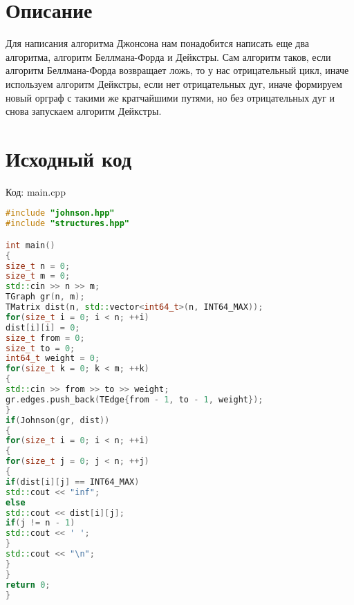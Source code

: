 \section{Описание}
Для написания алгоритма Джонсона нам понадобится написать еще два алгоритма, алгоритм Беллмана-Форда и Дейкстры. Сам алгоритм таков, если алгоритм
Беллмана-Форда возвращает ложь, то у нас отрицательный цикл, иначе используем
алгоритм Дейкстры, если нет отрицательных дуг, иначе формируем новый орграф
с такими же кратчайшими путями, но без отрицательных дуг и снова запускаем
алгоритм Дейкстры.

\pagebreak

\section{Исходный код}

Код: main.cpp
\begin{lstlisting}[language=C++]
#include "johnson.hpp"
#include "structures.hpp"

int main()
{
size_t n = 0;
size_t m = 0;
std::cin >> n >> m;
TGraph gr(n, m);
TMatrix dist(n, std::vector<int64_t>(n, INT64_MAX));
for(size_t i = 0; i < n; ++i)
dist[i][i] = 0;
size_t from = 0;
size_t to = 0;
int64_t weight = 0;
for(size_t k = 0; k < m; ++k)
{
std::cin >> from >> to >> weight;
gr.edges.push_back(TEdge{from - 1, to - 1, weight});
}
if(Johnson(gr, dist))
{
for(size_t i = 0; i < n; ++i)
{
for(size_t j = 0; j < n; ++j)
{
if(dist[i][j] == INT64_MAX)
std::cout << "inf";
else
std::cout << dist[i][j];
if(j != n - 1)
std::cout << ' ';
}
std::cout << "\n";
}
}
return 0;
}
\end{lstlisting}
\pagebreak

